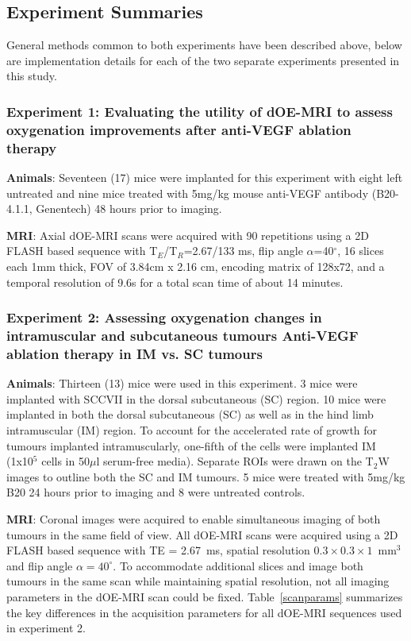 \subsection{Experiment Summaries}
General methods common to both experiments have been described above, below are implementation details for each of the two separate experiments presented in this study.

\subsubsection{Experiment 1: Evaluating the utility of dOE-MRI to assess oxygenation improvements after anti-VEGF ablation therapy}
\label{sec:B20_expt1}
\noindent\textbf{Animals}: Seventeen (17) mice were implanted for this experiment with eight left untreated and nine mice treated with 5mg/kg mouse anti-VEGF antibody (B20-4.1.1, Genentech) 48 hours prior to imaging.

\noindent\textbf{MRI}: Axial \ac{dOE-MRI} scans were acquired with 90 repetitions using a 2D FLASH based sequence with T$_E$/T$_R$=2.67/133 ms, flip angle $\alpha$=40$^\circ$, 16 slices each 1mm thick, FOV of 3.84cm x 2.16 cm, encoding matrix of 128x72, and a temporal resolution of 9.6s for a total scan time of about 14 minutes.

\subsubsection{Experiment 2: Assessing oxygenation changes in intramuscular and subcutaneous tumours Anti-VEGF ablation therapy in \acs{IM} vs. \acs{SC} tumours}
\noindent\textbf{Animals}: Thirteen (13) mice were used in this experiment. 
3 mice were implanted with SCCVII in the dorsal subcutaneous (\acs{SC}) region.
10 mice were implanted in both the dorsal subcutaneous (\acs{SC}) as well as in the hind limb intramuscular (\acs{IM}) region.
To account for the accelerated rate of growth for tumours implanted intramuscularly, one-fifth of the cells were implanted \acs{IM} (1x10$^5$ cells in 50$\mu$l serum-free media).
Separate ROIs were drawn on the T$_2$W images to outline both the \acs{SC} and \acs{IM} tumours.
5 mice were treated with 5mg/kg B20 24 hours prior to imaging and 8 were untreated controls.

\noindent\textbf{MRI}: Coronal images were acquired to enable simultaneous imaging of both tumours in the same field of view.
All \ac{dOE-MRI} scans were acquired using a 2D FLASH based sequence with TE = 2.67~ms, spatial resolution $0.3\times 0.3\times 1$~mm$^3$ and flip angle $\alpha=40^\circ$.
To accommodate additional slices and image both tumours in the same scan while maintaining spatial resolution, not all imaging parameters in the \ac{dOE-MRI} scan could be fixed. 
Table~\ref{scanparams} summarizes the key differences in the acquisition parameters for all \ac{dOE-MRI} sequences used in experiment 2.


